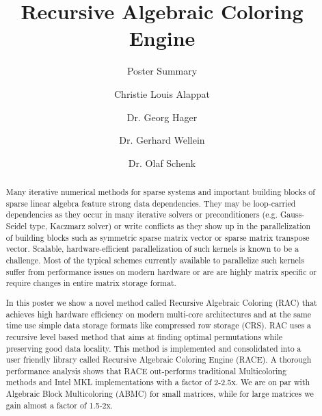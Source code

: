 \documentclass[sigplan, review]{acmart}
\begin{document}
\title[RACE]{Recursive Algebraic Coloring Engine}
\subtitle{Poster Summary}

\author{Christie Louis Alappat}

\author{Dr. Georg Hager}

\author{Dr. Gerhard Wellein}

\author{Dr. Olaf Schenk}

\renewcommand{\shortauthors}{C. Alappat et al.}



\begin{abstract}
Many iterative numerical methods for sparse systems and important building blocks of sparse linear algebra feature strong data dependencies. They may be loop-carried dependencies as they occur in many iterative solvers or preconditioners (e.g. Gauss-Seidel type, Kaczmarz solver) or write conflicts as they show up in the parallelization of building blocks such as symmetric sparse matrix vector or sparse matrix transpose vector. Scalable, hardware-efficient parallelization of such kernels is known to be a challenge. Most of the typical schemes currently available to parallelize such kernels suffer from performance issues on modern hardware or are are highly matrix specific or require changes in entire matrix storage format.

In this poster we show a novel method called Recursive Algebraic Coloring (RAC) that achieves high hardware efficiency on modern multi-core architectures and at the same time use simple data storage formats like compressed row storage (CRS). RAC uses a recursive level based method that aims at finding optimal permutations while preserving good data locality. This method is implemented and consolidated into a user friendly library called Recursive Algebraic Coloring Engine (RACE). A thorough performance analysis shows that RACE out-performs traditional Multicoloring methods and Intel MKL implementations with a factor of 2-2.5x. We are on par with Algebraic Block Multicoloring (ABMC) for small matrices, while for large matrices we gain almost a factor of 1.5-2x.
\end{abstract}
\end{document}

